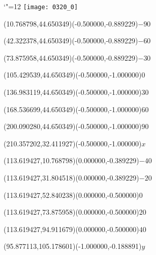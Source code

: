 \documentclass[12pt]{article}
\begin{document}
\makeatletter%
\let\ASYencoding\f@encoding%
\let\ASYfamily\f@family%
\let\ASYseries\f@series%
\let\ASYshape\f@shape%
\makeatother%
{\catcode`"=12%
\texttt{[image: 0320\_0]}%
}%
\kern -215.447780pt%
%
%
\fontsize{8.030000}{9.636000}\selectfont%
\usefont{\ASYencoding}{\ASYfamily}{\ASYseries}{\ASYshape}%
\ASYalign(10.768798,44.650349)(-0.500000,-0.889229){\vphantom{$10^4$}$-90$}%
%
%
\fontsize{8.030000}{9.636000}\selectfont%
\ASYalign(42.322378,44.650349)(-0.500000,-0.889229){\vphantom{$10^4$}$-60$}%
%
%
\fontsize{8.030000}{9.636000}\selectfont%
\ASYalign(73.875958,44.650349)(-0.500000,-0.889229){\vphantom{$10^4$}$-30$}%
%
%
\fontsize{8.030000}{9.636000}\selectfont%
\ASYalign(105.429539,44.650349)(-0.500000,-1.000000){\vphantom{$10^4$}$0$}%
%
%
\fontsize{8.030000}{9.636000}\selectfont%
\ASYalign(136.983119,44.650349)(-0.500000,-1.000000){\vphantom{$10^4$}$30$}%
%
%
\fontsize{8.030000}{9.636000}\selectfont%
\ASYalign(168.536699,44.650349)(-0.500000,-1.000000){\vphantom{$10^4$}$60$}%
%
%
\fontsize{8.030000}{9.636000}\selectfont%
\ASYalign(200.090280,44.650349)(-0.500000,-1.000000){\vphantom{$10^4$}$90$}%
%
%
\fontsize{12.000000}{14.400000}\selectfont%
\ASYalign(210.357202,32.411927)(-0.500000,-1.000000){$x$}%
%
%
\fontsize{8.030000}{9.636000}\selectfont%
\ASYalign(113.619427,10.768798)(0.000000,-0.389229){\vphantom{$10^4$}$-40$}%
%
%
\fontsize{8.030000}{9.636000}\selectfont%
\ASYalign(113.619427,31.804518)(0.000000,-0.389229){\vphantom{$10^4$}$-20$}%
%
%
\fontsize{8.030000}{9.636000}\selectfont%
\ASYalign(113.619427,52.840238)(0.000000,-0.500000){\vphantom{$10^4$}$0$}%
%
%
\fontsize{8.030000}{9.636000}\selectfont%
\ASYalign(113.619427,73.875958)(0.000000,-0.500000){\vphantom{$10^4$}$20$}%
%
%
\fontsize{8.030000}{9.636000}\selectfont%
\ASYalign(113.619427,94.911679)(0.000000,-0.500000){\vphantom{$10^4$}$40$}%
%
%
\fontsize{12.000000}{14.400000}\selectfont%
\ASYalign(95.877113,105.178601)(-1.000000,-0.188891){$y$}%
\end{document}
